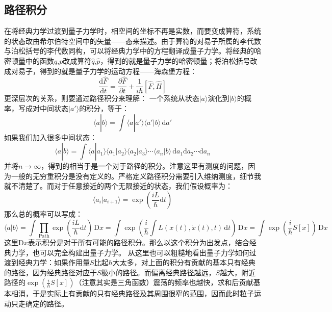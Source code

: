 \documentclass{ctexart}
\begin{document}
\subsection{路径积分}
在将经典力学过渡到量子力学时，相空间的坐标不再是实数，而要变成算符，系统的状态改由希尔伯特空间中的矢量——态来描述。由于算符的对易子所属的李代数与泊松括号的李代数同构，可以将经典力学中的方程翻译成量子力学。将经典的哈密顿量中的函数$q$,$p$改成算符$\hat{q}$,$\hat{p}$，得到的就是量子力学的哈密顿量；将泊松括号改成对易子，得到的就是量子力学的运动方程——海森堡方程：
\begin{equation}
\frac{\mathrm{d}\hat{F}}{\mathrm{d}t}=\frac{\partial\hat{F}}{\partial t}+\frac{1}{i\hbar}[\hat{F},\hat{H}]
\end{equation}
更深层次的关系，则要通过路径积分来理解：
一个系统从状态$|a\rangle$演化到$|b\rangle$的概率，写成对中间状态$|a'\rangle$的积分，等于：
\begin{equation}
\langle a|b\rangle=\int\langle a|a'\rangle\langle a'|b\rangle\,\mathrm{d}a'
\end{equation}
如果我们加入很多中间状态：
\begin{equation}
\langle a|b\rangle=\int\langle a|a_1\rangle\langle a_1|a_2\rangle\langle a_2|a_3\rangle\cdots\langle a_n|b\rangle\,\mathrm{d}a_1\mathrm{d}a_2\cdots\mathrm{d}a_n
\end{equation}
并将$n\to\infty$，得到的相当于是一个对于路径的积分。注意这里有测度的问题，因为一般的无穷重积分是没有定义的。严格定义路径积分需要引入维纳测度，细节我就不清楚了。而对于任意接近的两个无限接近的状态，我们假设概率为：
\begin{equation}
\langle a_i|a_{i+1}\rangle=\exp\left(\frac{iL}{\hbar}\mathrm{d}t\right)
\end{equation}
那么总的概率可以写成：
\begin{equation}
\langle a|b\rangle=\int\prod_{\mathrm{Path}}\exp\left(\frac{iL}{\hbar}\mathrm{d}t\right)\,\mathrm{D}x=\int\exp\left(\frac{i}{\hbar}\int L(x(t),\dot{x}(t),t)\,\mathrm{d}t\right)\,\mathrm{D}x=\int\exp\left(\frac{i}{\hbar}S[x]\right)\,\mathrm{D}x
\end{equation}
这里$\mathrm{D}x$表示积分是对于所有可能的路径积分。那么以这个积分为出发点，结合经典力学，也可以完全构建出量子力学。
从这里也可以粗糙地看出量子力学如何过渡到经典力学：如果作用量$S$比起$\hbar$大太多，对上面的积分有贡献的基本只有经典的路径，因为经典路径对应于$S$极小的路径。而偏离经典路径越远，$S$越大，附近路径的$\exp\left(\frac{i}{\hbar}S[x]\right)$（注意其实是三角函数）震荡的频率也越快，求和后贡献基本相消，于是实际上有贡献的只有经典路径及其周围很窄的范围，因而此时粒子运动只走确定的路径。
\end{document}

